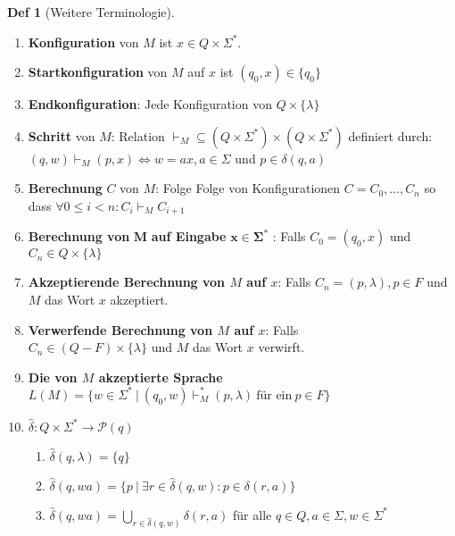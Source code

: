 \documentclass[a4paper, 10pt]{article}
\theoremstyle{definition}
\newtheorem*{definition*}{Def}
\newcommand{\words}{\Sigma^*}
\newcommand{\A}{\Sigma}
\begin{document}
\begin{definition*}[Weitere Terminologie] \(\;\)
    \begin{enumerate}
        \item \textbf{Konfiguration} von \(M\) ist \(x \in Q \times \words\).
        \item \textbf{Startkonfiguration} von \(M\) auf \(x\) ist \((q_0, x) \in \{q_0\}\)
        \item \textbf{Endkonfiguration}: Jede Konfiguration von \(Q \times \{\lambda\}\)
        \item \textbf{Schritt} von \(M\): Relation \(\vdash_M \subseteq (Q \times \words) \times (Q \times \words)\) definiert durch: \\ \((q, w) \vdash_M (p, x) \iff w = ax, a \in \A\) und \(p \bm{\in} \delta(q, a)\)
        \item \textbf{Berechnung} \(C\) von \(M\): Folge Folge von Konfigurationen \(C = C_0, \ldots, C_n\) so dass \(\forall 0 \leq i < n: C_i \vdash_M C_{i+1}\)
        \item \textbf{Berechnung von} \(\bm{M}\) \textbf{auf Eingabe} \(\bm{x \in \words}\) : Falls \(C_0 = (q_0, x)\) und \(C_n \in Q \times \{\lambda\}\)
        \item \textbf{Akzeptierende Berechnung von \(M\) auf \(x\)}: Falls \(C_n = (p, \lambda), p \in F \) und \(M\) das Wort \(x\) akzeptiert.
        \item \textbf{Verwerfende Berechnung von \(M\) auf \(x\)}: Falls \\ \(C_n \in (Q - F) \times \{\lambda\}\) und \(M\) das Wort \(x\) verwirft. 
        \item \textbf{Die von \(M\) akzeptierte Sprache}
            \(L(M) = \{w \in \words \ | \ (q_0, w) \vdash_M^* (p, \lambda) \ \text{für ein} \ p \in F \}\)
        \item \(\hat{\delta}: Q \times \words \to \mathcal{P}(q)\)
        \begin{enumerate}
            \item \(\hat{\delta}(q, \lambda) = \{q\}\)
            \item \(\hat{\delta}(q, wa) = \{p \ | \ \exists r \in \hat{\delta}(q, w) : p \in \delta(r, a)\}\)
            \item \(\hat{\delta}(q, wa) = \bigcup_{r \in \hat{\delta}(q, w)}\delta(r, a)\) für alle \(q \in Q, a \in \A, w \in \words\)
        \end{enumerate}
    \end{enumerate}
\end{definition*}
\end{document}
